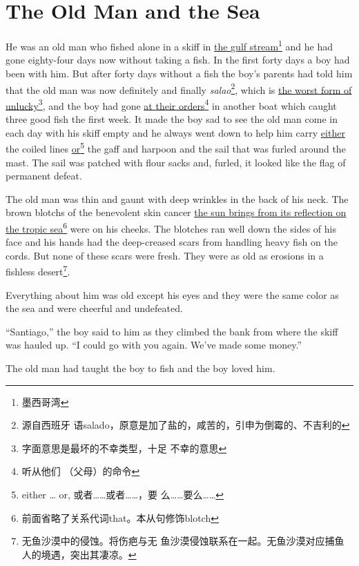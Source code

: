 \chapter{The Old Man and the Sea}

He was an old man who fished alone in a \gls{skiff} in \uline{the \Gls{gulf}
  \Gls{stream}}\footnote{墨西哥湾} and he had gone eighty-four days now without
taking a fish. In the first forty days a boy had been with him. But after
forty days without a fish the boy's parents had told him that the old man
was now \gls{definitely} and finally \emph{salao}\footnote{源自西班牙
  语salado，原意是加了盐的，咸苦的，引申为倒霉的、不吉利的}, which is
\uline{the worst \gls{form} of unlucky}\footnote{字面意思是最坏的不幸类型，十足
  不幸的意思}, and the boy had gone \uline{at their orders}\footnote{听从他们
  （父母）的命令} in another boat which caught three good fish the first
week. It made the boy sad to see the old man come in each day with his
skiff empty and he always went down to help him carry \uline{either} the
\gls{coiled} lines \uline{or}\footnote{either \ldots{} or, 或者……或者……，要
  么……要么……} the \gls{gaff} and \gls{harpoon} and the \gls{sail} that was
\gls{furled} around the \gls{mast}. The sail was patched with \gls{flour}
\glspl{sack} and, \gls{furled}, it looked like the flag of \gls{permanent} \gls{defeat}.

The old man was thin and \gls{gaunt} with deep \glspl{wrinkle} in the back
of his neck. The brown \glspl{blotch} of the \gls{benevolent} \gls{skin}
cancer \uline{the sun \glspl{bring} from its \gls{reflection} on the
  \gls{tropic} sea}\footnote{前面省略了关系代词that。本从句修饰blotch} were
on his \glspl{cheek}. The blotches ran well down the sides of his face and his
hands had the \gls{deep-creased} \glspl{scar} from handling heavy fish on
the \glspl{cord}. But none of these scars were fresh. They were \gls{as} old
as \glspl{erosion} in a fishless desert\footnote{无鱼沙漠中的侵蚀。将伤疤与无
  鱼沙漠侵蚀联系在一起。无鱼沙漠对应捕鱼人的境遇，突出其凄凉。}.

Everything about him was old \gls{except} his eyes and they were the same
color as the sea and were \gls{cheerful} and \gls{undefeated}.

``Santiago,'' the boy said to him as they climbed the \gls{bank} from where the
skiff was \gls{hauled} up. ``I could go with you again. We've made some money.''

The old man had taught the boy to fish and the boy loved him.

